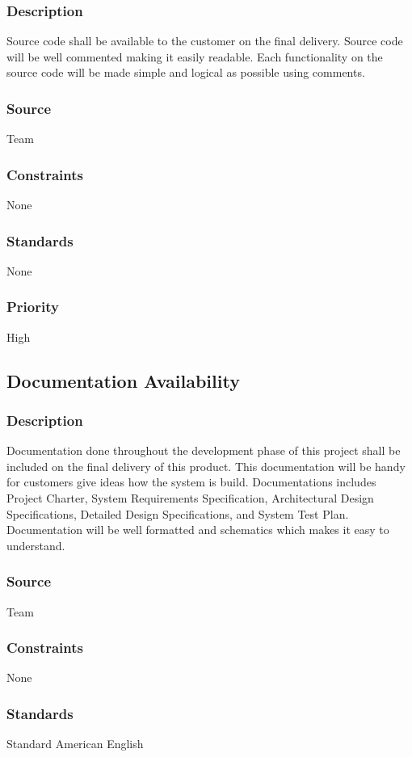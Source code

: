 \subsubsection{Description}
Source code shall be available to the customer on the final delivery. Source code will be well commented making it easily readable. Each functionality on the source code will be made simple and logical as possible using comments. 
\subsubsection{Source}
Team 
\subsubsection{Constraints}
None
\subsubsection{Standards}
None
\subsubsection{Priority}
High

\subsection{Documentation Availability}
\subsubsection{Description}
Documentation done throughout the development phase of this project shall be included on the final delivery of this product. This documentation will be handy for customers give ideas how the system is build. Documentations includes Project Charter, System Requirements Specification, Architectural Design Specifications, Detailed Design Specifications, and System Test Plan. Documentation will be well formatted and schematics which makes it easy to understand. 
\subsubsection{Source}
Team
\subsubsection{Constraints}
None
\subsubsection{Standards}
Standard American English
